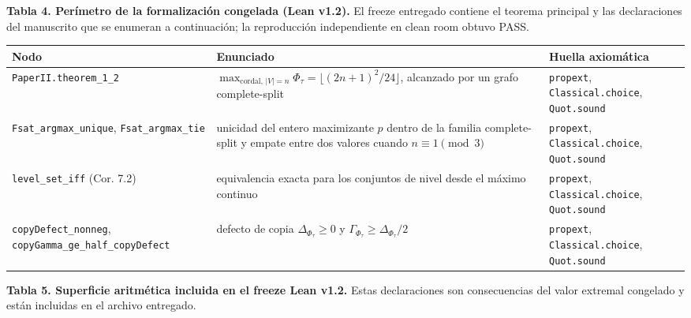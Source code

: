 \documentclass[spanish,11pt,a4paper]{article}
\newcounter{none}
\begin{document}
\textbf{Tabla 4. Perímetro de la formalización congelada (Lean v1.2).}
El freeze entregado contiene el teorema principal y las declaraciones
del manuscrito que se enumeran a continuación; la reproducción
independiente en clean room obtuvo PASS.

{\def\LTcaptype{none} %
\begin{longtable}[]{@{}
  >{\raggedright\arraybackslash}p{}
  >{\raggedright\arraybackslash}p{}
  >{\raggedright\arraybackslash}p{}@{}}
\toprule\noalign{}
\begin{minipage}[b]{\linewidth}\raggedright
Nodo
\end{minipage} & \begin{minipage}[b]{\linewidth}\raggedright
Enunciado
\end{minipage} & \begin{minipage}[b]{\linewidth}\raggedright
Huella axiomática
\end{minipage} \\
\midrule\noalign{}
\endhead
\bottomrule\noalign{}
\endlastfoot
\nolinkurl{PaperII.theorem_1_2} &
\(\max_{\text{cordal},\,|V|=n}\Phi_\tau=\lfloor(2n+1)^2/24\rfloor\),
alcanzado por un grafo complete-split & \nolinkurl{propext},
\nolinkurl{Classical.choice}, \nolinkurl{Quot.sound} \\
\nolinkurl{Fsat_argmax_unique}, \nolinkurl{Fsat_argmax_tie} & unicidad del
entero maximizante \(p\) dentro de la familia complete-split y empate
entre dos valores cuando \(n\equiv1\pmod3\) & \nolinkurl{propext},
\nolinkurl{Classical.choice}, \nolinkurl{Quot.sound} \\
\nolinkurl{level_set_iff} (Cor. 7.2) & equivalencia exacta para los
conjuntos de nivel desde el máximo continuo & \nolinkurl{propext},
\nolinkurl{Classical.choice}, \nolinkurl{Quot.sound} \\
\nolinkurl{copyDefect_nonneg}, \nolinkurl{copyGamma_ge_half_copyDefect} &
defecto de copia \(\Delta_{\Phi_\tau}\ge0\) y
\(\Gamma_{\Phi_\tau}\ge\Delta_{\Phi_\tau}/2\) & \nolinkurl{propext},
\nolinkurl{Classical.choice}, \nolinkurl{Quot.sound} \\
\end{longtable}
}

\textbf{Tabla 5. Superficie aritmética incluida en el freeze Lean v1.2.}
Estas declaraciones son consecuencias del valor extremal congelado y
están incluidas en el archivo entregado.
\end{document}
